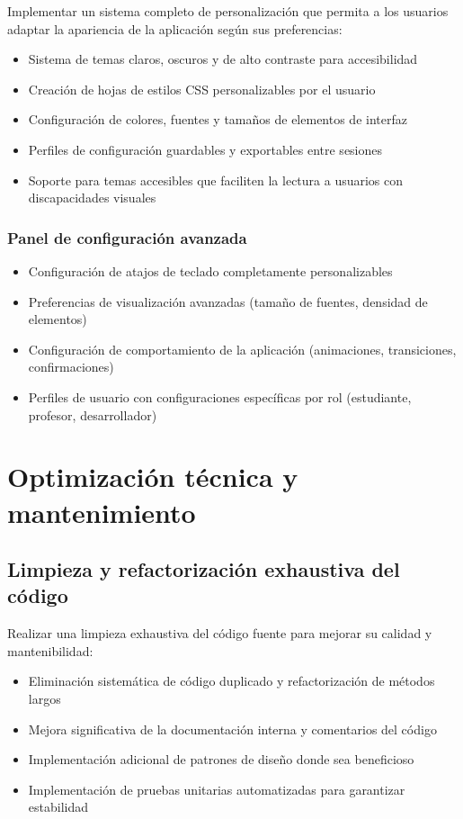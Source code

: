 Implementar un sistema completo de personalización que permita a los usuarios adaptar la apariencia de la aplicación según sus preferencias:
\begin{itemize}
 \item Sistema de temas claros, oscuros y de alto contraste para accesibilidad
 \item Creación de hojas de estilos CSS personalizables por el usuario
 \item Configuración de colores, fuentes y tamaños de elementos de interfaz
 \item Perfiles de configuración guardables y exportables entre sesiones
 \item Soporte para temas accesibles que faciliten la lectura a usuarios con discapacidades visuales
\end{itemize}

\subsubsection{Panel de configuración avanzada}

\begin{itemize}
 \item Configuración de atajos de teclado completamente personalizables
 \item Preferencias de visualización avanzadas (tamaño de fuentes, densidad de elementos)
 \item Configuración de comportamiento de la aplicación (animaciones, transiciones, confirmaciones)
 \item Perfiles de usuario con configuraciones específicas por rol (estudiante, profesor, desarrollador)
\end{itemize}

\section{Optimización técnica y mantenimiento}

\subsection{Limpieza y refactorización exhaustiva del código}

Realizar una limpieza exhaustiva del código fuente para mejorar su calidad y mantenibilidad:
\begin{itemize}
 \item Eliminación sistemática de código duplicado y refactorización de métodos largos
 \item Mejora significativa de la documentación interna y comentarios del código
 \item Implementación adicional de patrones de diseño donde sea beneficioso
 \item Implementación de pruebas unitarias automatizadas para garantizar estabilidad
\end{itemize}

